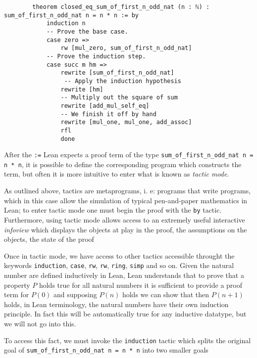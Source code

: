 \begin{example}
    \begin{footnotesize}
    \begin{verbatim}
        theorem closed_eq_sum_of_first_n_odd_nat (n : ℕ) : sum_of_first_n_odd_nat n = n * n := by
            induction n
            -- Prove the base case.
            case zero =>
                rw [mul_zero, sum_of_first_n_odd_nat]
            -- Prove the induction step.
            case succ m hm =>
                rewrite [sum_of_first_n_odd_nat]
                 -- Apply the induction hypothesis
                rewrite [hm]
                -- Multiply out the square of sum
                rewrite [add_mul_self_eq]
                -- We finish it off by hand
                rewrite [mul_one, mul_one, add_assoc]
                rfl
                done
    \end{verbatim}
    \end{footnotesize}

    After the \texttt{:=} Lean expects a proof term of the type \texttt{sum\_of\_first\_n\_odd\_nat n = n * n}, it is possible to
    define the corresponding program which constructs the term, but often it is more intuitive to enter what is known as \textit{tactic mode}.

    As outlined above, tactics are metaprograms, i. e: programs that write programs, which in this case allow the simulation of typical pen-and-paper mathematics
    in Lean; to enter tactic mode one must begin the proof with the \texttt{by} tactic. Furthermore, using tactic mode allows access to an extremely useful
    interactive \textit{infoview} which displays the objects at play in the proof, the assumptions on the objects, the state of the proof

    Once in tactic mode, we have access to other tactics accessible throught the keywords \texttt{induction}, \texttt{case}, \texttt{rw}, \texttt{rw}, \texttt{ring}, \texttt{simp} and so on.
    Given the natural number are defined inductively in Lean, Lean understands that to prove that a property $P$ holds true for all natural numbers
    it is sufficient to provide a proof term for $P(0)$ and supposing $P(n)$ holds we can show that then $P(n+1)$ holds, in Lean terminology, the natural numbers
    have their own induction principle. In fact this will be automatically true for any inductive datatype, but we will not go into this.
    
    To access this fact, we must invoke the \texttt{induction} tactic which splits the original goal of \texttt{sum\_of\_first\_n\_odd\_nat n = n * n} into two smaller goals


\end{example}
